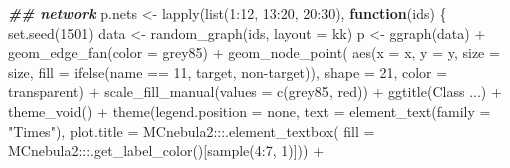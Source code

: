 \documentclass[
]{article}
\newenvironment{Shaded}{\begin{snugshade}}{\end{snugshade}}
\newcommand{\AttributeTok}[1]{\textcolor[rgb]{0.77,0.63,0.00}{#1}}
\newcommand{\ControlFlowTok}[1]{\textcolor[rgb]{0.13,0.29,0.53}{\textbf{#1}}}
\newcommand{\DecValTok}[1]{\textcolor[rgb]{0.00,0.00,0.81}{#1}}
\newcommand{\DocumentationTok}[1]{\textcolor[rgb]{0.56,0.35,0.01}{\textbf{\textit{#1}}}}
\newcommand{\FunctionTok}[1]{\textcolor[rgb]{0.00,0.00,0.00}{#1}}
\newcommand{\NormalTok}[1]{#1}
\newcommand{\OtherTok}[1]{\textcolor[rgb]{0.56,0.35,0.01}{#1}}
\newcommand{\SpecialCharTok}[1]{\textcolor[rgb]{0.00,0.00,0.00}{#1}}
\newcommand{\StringTok}[1]{\textcolor[rgb]{0.31,0.60,0.02}{#1}}
\begin{document}
\begin{Shaded}
\begin{Highlighting}[]
\DocumentationTok{\#\# network}
\NormalTok{p.nets }\OtherTok{\textless{}{-}} \FunctionTok{lapply}\NormalTok{(}\FunctionTok{list}\NormalTok{(}\DecValTok{1}\SpecialCharTok{:}\DecValTok{12}\NormalTok{, }\DecValTok{13}\SpecialCharTok{:}\DecValTok{20}\NormalTok{, }\DecValTok{20}\SpecialCharTok{:}\DecValTok{30}\NormalTok{),}
  \ControlFlowTok{function}\NormalTok{(ids) \{}
    \FunctionTok{set.seed}\NormalTok{(}\DecValTok{1501}\NormalTok{)}
\NormalTok{    data }\OtherTok{\textless{}{-}} \FunctionTok{random\_graph}\NormalTok{(ids, }\AttributeTok{layout =} \StringTok{\textquotesingle{}kk\textquotesingle{}}\NormalTok{)}
\NormalTok{    p }\OtherTok{\textless{}{-}} \FunctionTok{ggraph}\NormalTok{(data) }\SpecialCharTok{+}
      \FunctionTok{geom\_edge\_fan}\NormalTok{(}\AttributeTok{color =} \StringTok{\textquotesingle{}grey85\textquotesingle{}}\NormalTok{) }\SpecialCharTok{+}
      \FunctionTok{geom\_node\_point}\NormalTok{(}
        \FunctionTok{aes}\NormalTok{(}\AttributeTok{x =}\NormalTok{ x, }\AttributeTok{y =}\NormalTok{ y, }\AttributeTok{size =}\NormalTok{ size,}
          \AttributeTok{fill =} \FunctionTok{ifelse}\NormalTok{(name }\SpecialCharTok{==} \StringTok{\textquotesingle{}11\textquotesingle{}}\NormalTok{, }\StringTok{\textquotesingle{}target\textquotesingle{}}\NormalTok{, }\StringTok{\textquotesingle{}non{-}target\textquotesingle{}}\NormalTok{)),}
        \AttributeTok{shape =} \DecValTok{21}\NormalTok{, }\AttributeTok{color =} \StringTok{\textquotesingle{}transparent\textquotesingle{}}\NormalTok{) }\SpecialCharTok{+}
      \FunctionTok{scale\_fill\_manual}\NormalTok{(}\AttributeTok{values =} \FunctionTok{c}\NormalTok{(}\StringTok{\textquotesingle{}grey85\textquotesingle{}}\NormalTok{, }\StringTok{\textquotesingle{}red\textquotesingle{}}\NormalTok{)) }\SpecialCharTok{+}
      \FunctionTok{ggtitle}\NormalTok{(}\StringTok{\textquotesingle{}Class ...\textquotesingle{}}\NormalTok{) }\SpecialCharTok{+}
      \FunctionTok{theme\_void}\NormalTok{() }\SpecialCharTok{+}
      \FunctionTok{theme}\NormalTok{(}\AttributeTok{legend.position =} \StringTok{\textquotesingle{}none\textquotesingle{}}\NormalTok{,}
        \AttributeTok{text =} \FunctionTok{element\_text}\NormalTok{(}\AttributeTok{family =} \StringTok{"Times"}\NormalTok{),}
        \AttributeTok{plot.title =}\NormalTok{ MCnebula2}\SpecialCharTok{:::}\FunctionTok{.element\_textbox}\NormalTok{(}
          \AttributeTok{fill =}\NormalTok{ MCnebula2}\SpecialCharTok{:::}\FunctionTok{.get\_label\_color}\NormalTok{()[}\FunctionTok{sample}\NormalTok{(}\DecValTok{4}\SpecialCharTok{:}\DecValTok{7}\NormalTok{, }\DecValTok{1}\NormalTok{)])) }\SpecialCharTok{+}

\end{Highlighting}
\end{Shaded}
\end{document}
